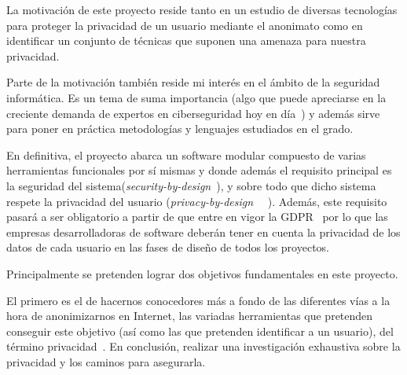 La motivación de este proyecto reside tanto en un estudio de diversas
tecnologías para proteger la privacidad de un usuario mediante el
anonimato como en identificar un conjunto de técnicas que suponen una
amenaza para nuestra privacidad.
 
Parte de la motivación también reside mi interés en el ámbito de la
seguridad informática. Es un tema de suma importancia (algo que puede
apreciarse en la creciente demanda de expertos en ciberseguridad hoy
en día~\cite{article:expCiberseguridad}) y además sirve para poner en
práctica metodologías y lenguajes estudiados en el grado.

En definitiva, el proyecto abarca un software modular compuesto de
varias herramientas funcionales por sí mismas y donde además el
requisito principal es la seguridad del
sistema(\textit{security-by-design}~\cite{paper:secbydesign}), y sobre
todo que dicho sistema respete la privacidad del usuario
(\textit{privacy-by-design}~\cite{paper:privacybydesign}
~\cite{cavoukian2009privacy}). Además, este requisito pasará a ser
obligatorio a partir de que entre en vigor la GDPR~\cite{article:PbDGDPR}  por
lo que las empresas desarrolladoras de software deberán tener en
cuenta la privacidad de los datos de cada usuario en las fases de
diseño de todos los proyectos.



Principalmente se pretenden lograr dos objetivos fundamentales en este proyecto.

El primero es el de hacernos conocedores más a fondo de las diferentes
vías a la hora de anonimizarnos en Internet, las variadas herramientas
que pretenden conseguir este objetivo (así como las que pretenden
identificar a un usuario),  del término
privacidad~\cite{article:danezis2010}.  En conclusión,  realizar una investigación exhaustiva sobre
la  privacidad y los caminos para
asegurarla.

